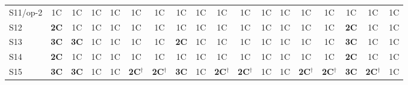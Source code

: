 \documentclass[11pt]{article}
\begin{document}
\begin{table}[!htbp]
\begin{tabular}{@{}l*{8}{c}|*{9}{c}@{}}
S11/op-2 & 1C & 1C & 1C & 1C & 1C & 1C & 1C & 1C & 1C & 1C & 1C & 1C & 1C & 1C & 1C & 1C & 1C \\
S12 & \textbf{2C} & 1C & 1C & 1C & 1C & 1C & 1C & 1C & 1C & 1C & 1C & 1C & 1C & 1C & \textbf{2C} & 1C & 1C \\
S13 & \textbf{3C} & \textbf{3C} & 1C & 1C & 1C & 1C & \textbf{2C} & 1C & 1C & 1C & 1C & 1C & 1C & 1C & \textbf{3C} & 1C & 1C \\
S14 & \textbf{2C} & 1C & 1C & 1C & 1C & 1C & 1C & 1C & 1C & 1C & 1C & 1C & 1C & 1C & \textbf{2C} & 1C & 1C \\
S15 & \textbf{3C} & \textbf{3C} & 1C & 1C & \textbf{2C}$^\dagger$ & \textbf{2C}$^\dagger$ & \textbf{3C} & 1C & \textbf{2C}$^\dagger$ & \textbf{2C}$^\dagger$ & 1C & 1C & \textbf{2C}$^\dagger$ & \textbf{2C}$^\dagger$ & \textbf{3C} & \textbf{2C}$^\dagger$ & 1C \\
\bottomrule
\end{tabular}
\end{table}
\end{document}
